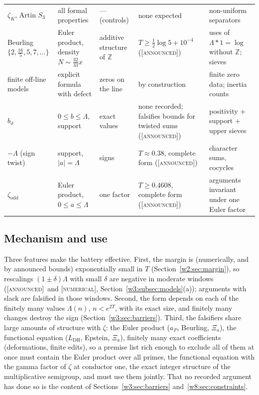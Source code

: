 \documentclass[11pt]{amsart}
\theoremstyle{definition}
\theoremstyle{remark}
\numberwithin{equation}{section}
\newcommand{\Z}{\mathbb{Z}}
\newcommand{\stag}[1]{\textsc{[#1]}}
\newcommand{\NUM}{\stag{numerical}}
\newcommand{\ANNOUNCED}{\stag{announced}}
\begin{document}
{\begin{longtable}{>{\raggedright}p{2.6cm}>{\raggedright}p{2.9cm}>{\raggedright}p{2.3cm}>{\raggedright}p{2.4cm}>{\raggedright\arraybackslash}p{3.4cm}}
$\zeta_K$, Artin $S_3$ & all formal properties & --- (controls) & none expected & non-uniform separators\\
Beurling $\{2,\frac{16}5,5,7,\dots\}$ & Euler product, density $N\sim\frac{32}{33}x$ & additive structure of $\Z$ & $T\ge\frac12\log5+10^{-4}$ (\ANNOUNCED) & uses of $\Lambda\ast1=\log$ without $\Z$; sieves\\
finite off-line models & explicit formula with defect & zeros on the line & by construction & finite zero data; inertia counts\\
$b_\vartheta$ & $0\le b\le\Lambda$, support & exact values & none recorded; falsifies bounds for twisted sums (\ANNOUNCED) & positivity + support + upper sieves\\
$-\Lambda$ (sign twist) & support, $|a|=\Lambda$ & signs & $T\approx0.38$, complete form (\ANNOUNCED) & character sums, cocycles\\
$\zeta_{\mathrm{odd}}$ & Euler product, $0\le a\le\Lambda$ & one factor & $T\ge0.4608$, complete form (\ANNOUNCED) & arguments invariant under one Euler factor\\
\end{longtable}}

\subsection{Mechanism and use}\label{w3:subsec:use}

Three features make the battery effective. First, the margin is (numerically, and by announced bounds) exponentially small in $T$
(Section~\ref{w2:sec:margin}), so rescalings $(1\pm\delta)\Lambda$ with small $\delta$ are negative in
moderate windows (\ANNOUNCED\ and \NUM, Section~\ref{w3:subsec:models}(a)); arguments with slack are falsified in those windows. Second, the form depends on each of the finitely many
values $\Lambda(n)$, $n<e^{2T}$, with its exact size, and finitely many changes destroy the sign
(Section~\ref{w3:sec:barriers}). Third, the falsifiers share large amounts of structure with $\zeta$: the Euler
product ($a_P$, Beurling, $\Xi_a$), the functional equation ($L_{\mathrm{DH}}$, Epstein, $\Xi_a$), finitely many
exact coefficients (deformations, finite edits), so a premise list rich enough to exclude all of them at once
must contain the Euler product over all primes, the functional equation with the gamma factor of $\zeta$ at
conductor one, the exact integer structure of the multiplicative semigroup, and must use them jointly. That no
recorded argument has done so is the content of Sections~\ref{w3:sec:barriers} and~\ref{w8:sec:constraints}.
\end{document}
